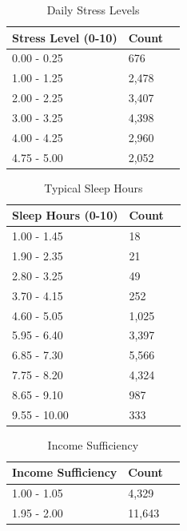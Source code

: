 \documentclass[runningheads]{llncs}
\begin{document}
\begin{enumerate}
\begin{table}[ht]
    \centering
    \caption{Daily Stress Levels}\label{tab1}
    \begin{tabular}{|l|l|l|}
        \hline
        \textbf{Stress Level (0-10)} & \textbf{Count} \\ 
        \hline
        0.00 - 0.25 & 676 \\ 
        1.00 - 1.25 & 2,478 \\ 
        2.00 - 2.25 & 3,407 \\ 
        3.00 - 3.25 & 4,398 \\ 
        4.00 - 4.25 & 2,960 \\ 
        4.75 - 5.00 & 2,052 \\ 
        \hline
    \end{tabular}
\end{table}

\begin{table}[ht]
    \centering
    \caption{Typical Sleep Hours}\label{tab1}
    \begin{tabular}{|l|l|l|}
        \hline
        \textbf{Sleep Hours (0-10)} & \textbf{Count} \\ 
        \hline
        1.00 - 1.45 & 18 \\ 
        1.90 - 2.35 & 21 \\ 
        2.80 - 3.25 & 49 \\ 
        3.70 - 4.15 & 252 \\ 
        4.60 - 5.05 & 1,025 \\ 
        5.95 - 6.40 & 3,397 \\ 
        6.85 - 7.30 & 5,566 \\ 
        7.75 - 8.20 & 4,324 \\ 
        8.65 - 9.10 & 987 \\ 
        9.55 - 10.00 & 333 \\ 
        \hline
    \end{tabular}
\end{table}
\clearpage
\begin{table}
    \centering
    \caption{Income Sufficiency}\label{tab1}
    \begin{tabular}{|l|l|l|}
        \hline
        \textbf{Income Sufficiency} & \textbf{Count} \\ 
        \hline
        1.00 - 1.05 & 4,329 \\ 
        1.95 - 2.00 & 11,643 \\ 
        \hline
    \end{tabular}
\end{table}



\end{enumerate}
\end{document}
